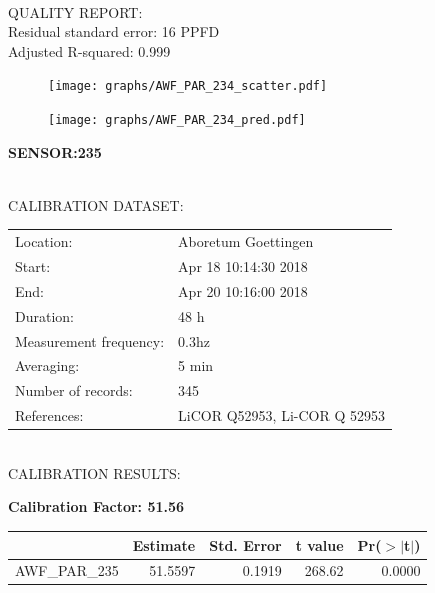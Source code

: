 \documentclass[oneside]{report}
\begin{document}
\hrulefill\\
QUALITY REPORT:\\
Residual standard error: 16 PPFD\\
Adjusted R-squared: 0.999



\begin{figure}[H]
  \centering
  \texttt{[image: graphs/AWF\_PAR\_234\_scatter.pdf]}
\end{figure}




\begin{figure}[H]
  \centering
  \texttt{[image: graphs/AWF\_PAR\_234\_pred.pdf]}
\end{figure}

\pagebreak


\begin{center}
\large{\textbf{SENSOR:235}}\\
\end{center}

\hrulefill\\
CALIBRATION DATASET:\\
\begin{table}[h!]
  \centering
  \label{tab:table1}
  \begin{tabular}{ll}
    Location: & Aboretum Goettingen\\ 
    
    
    Start:  & Apr 18 10:14:30 2018 \\
    End:   & Apr 20 10:16:00 2018\\ 
    Duration: & 48 h\\
    Measurement frequency: & 0.3hz\\
    Averaging:  &5 min\\
    Number of records: & 345 \\
    References: & LiCOR Q52953, Li-COR Q 52953 \\
  \end{tabular}
\end{table}

\hrulefill\\
CALIBRATION RESULTS:\\


\begin{center}
\textbf{\large{Calibration Factor: 51.56}}\\
\end{center}
\begin{table}[ht]
\centering
\begin{tabular}{rrrrr}
  \hline
 & Estimate & Std. Error & t value & Pr($>$$|$t$|$) \\ 
  \hline
AWF\_PAR\_235 & 51.5597 & 0.1919 & 268.62 & 0.0000 \\ 
   \hline
\end{tabular}
\end{table}
\end{document}
